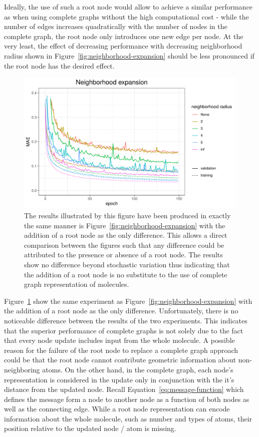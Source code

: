 Ideally, the use of such a root node would allow to achieve a similar performance as when using complete graphs without the high computational cost - while the number of edges increases quadratically with the number of nodes in the complete graph, the root node only introduces one new edge per node. At the very least, the effect of decreasing performance with decreasing neighborhood radius shown in Figure~\ref{fig:neighborhood-expansion} should be less pronounced if the root node has the desired effect.

\begin{figure}[H]
	\includegraphics[width=\linewidth]{figures/neighborhood-expansion-root-weight}
	\caption{The results illustrated by this figure have been produced in exactly the same manner is Figure~\ref{fig:neighborhood-expansion} with the addition of a root node as the only difference. This allows a direct comparison between the figures such that any difference could be attributed to the presence or absence of a root node. The results show no difference beyond stochastic variation thus indicating that the addition of a root node is no substitute to the use of complete graph representation of molecules.}
	\label{fig:neighborhood-expansion-root-weight}
\end{figure}

Figure~\ref{fig:neighborhood-expansion-root-weight} show the same experiment as Figure~\ref{fig:neighborhood-expansion} with the addition of a root node as the only difference. Unfortunately, there is no noticeable difference between the results of the two experiments. This indicates that the superior performance of complete graphs is not solely due to the fact that every node update includes input from the whole molecule. A possible reason for the failure of the root node to replace a complete graph approach could be that the root node cannot contribute geometric information about non-neighboring atoms. On the other hand, in the complete graph, each node's representation is considered in the update only in conjunction with the it's distance from the updated node. Recall Equation~\ref{eq:message-function} which defines the message form a node to another node as a function of both nodes as well as the connecting edge. While a root node representation can encode information about the whole molecule, such as number and types of atoms, their position relative to the updated node / atom is missing.





